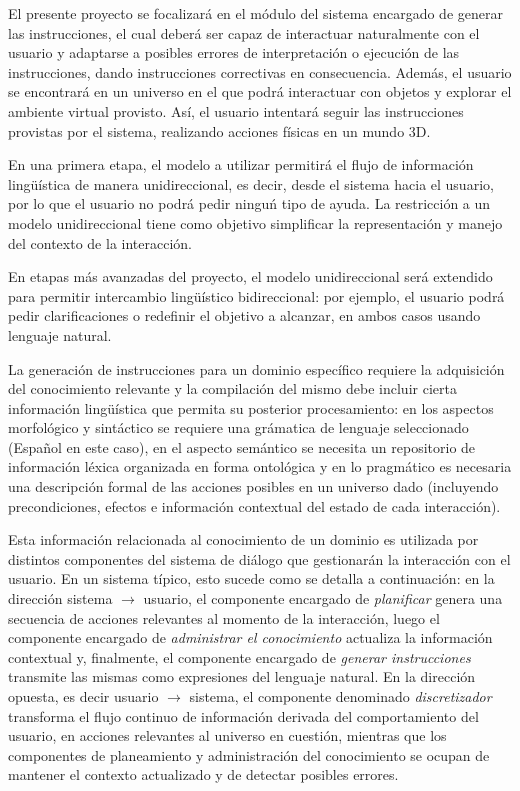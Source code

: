 El presente proyecto se focalizar\'a en el  m\'odulo del sistema encargado de generar las instrucciones, el cual deber\'a ser capaz de interactuar naturalmente con el usuario y adaptarse a posibles errores de interpretaci\'on o ejecuci\'on de las instrucciones, dando instrucciones correctivas en consecuencia. Adem\'as, el usuario se encontrar\'a en un universo en el que podr\'a interactuar con objetos y explorar el ambiente virtual provisto. As\'i, el usuario intentar\'a seguir las instrucciones provistas por el sistema,
realizando acciones f\'isicas en un mundo 3D.


En una primera etapa, el modelo a utilizar permitir\'a el flujo de informaci\'on ling\"u\'istica de manera unidireccional, es decir,
desde el sistema hacia el usuario, por lo que
el usuario no podr\'a pedir ningu\'n tipo de ayuda.  La restricci\'on a un
modelo unidireccional tiene como objetivo
simplificar la representaci\'on y manejo del contexto de la interacci\'on.

En etapas m\'as avanzadas del proyecto, el modelo unidireccional ser\'a extendido para
permitir intercambio ling\"u\'istico bidireccional: por ejemplo, el usuario podr\'a
pedir clarificaciones o redefinir el objetivo a alcanzar, en ambos casos usando lenguaje natural.

La generaci\'on de instrucciones para un dominio espec\'ifico requiere la adquisici\'on del conocimiento relevante y la compilaci\'on del mismo debe incluir cierta informaci\'on  ling\"u\'istica que permita su posterior procesamiento: en los aspectos morfol\'ogico y sint\'actico se requiere una gr\'amatica de lenguaje seleccionado (Espa\~nol en este caso), en el aspecto sem\'antico se necesita un repositorio de informaci\'on l\'exica organizada en forma ontol\'ogica y en lo pragm\'atico es necesaria una descripci\'on formal de las
acciones posibles en un universo dado (incluyendo precondiciones, efectos e informaci\'on contextual del estado de cada interacci\'on).

Esta informaci\'on relacionada al conocimiento de un dominio es utilizada por distintos componentes del sistema de di\'alogo que
gestionar\'an la interacci\'on con el usuario. En un sistema t\'ipico, esto sucede como se detalla a continuaci\'on: en la direcci\'on sistema $\rightarrow$ usuario, el componente encargado de \textit{planificar} genera una secuencia de acciones relevantes al momento de la interacci\'on, luego el componente encargado de  \textit{administrar el conocimiento} actualiza la informaci\'on contextual y,  finalmente, el componente encargado de
\textit{generar instrucciones}  transmite las mismas como expresiones
del lenguaje natural.  En la direcci\'on opuesta, es decir usuario $\rightarrow$ sistema,  el componente denominado \textit{discretizador}
transforma el flujo continuo de informaci\'on derivada del comportamiento del usuario, en acciones relevantes al universo en cuesti\'on, mientras que
los componentes de planeamiento y administraci\'on del conocimiento se ocupan
de mantener el contexto actualizado y de detectar posibles errores.


